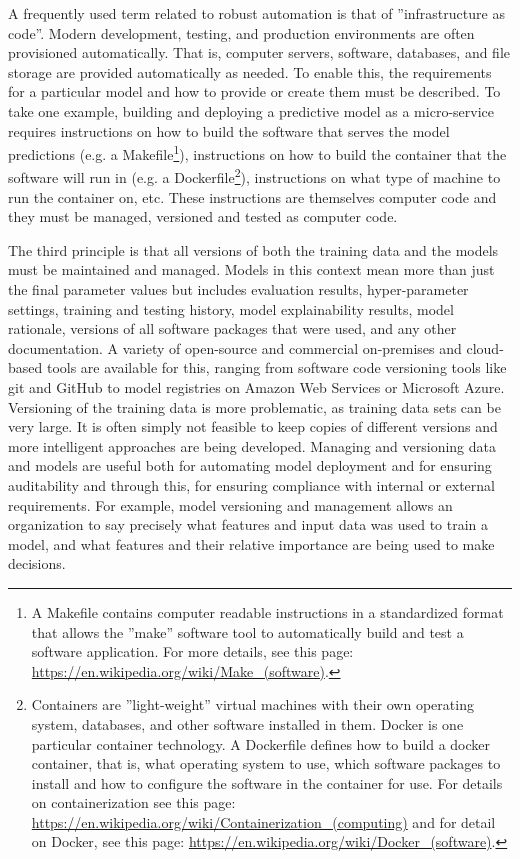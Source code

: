 A frequently used term related to robust automation is that of ''infrastructure as code''. Modern development, testing, and production environments are often provisioned automatically. That is, computer servers, software, databases, and file storage are provided automatically as needed. To enable this, the requirements for a particular model and how to provide or create them must be described. To take one example, building and deploying a predictive model as a micro-service requires instructions on how to build the software that serves the model predictions (e.g. a Makefile\footnote{A Makefile contains computer readable instructions in a standardized format that allows the ''make'' software tool to automatically build and test a software application. For more details, see this page: \url{https://en.wikipedia.org/wiki/Make_(software)}.}), instructions on how to build the container that the software will run in (e.g. a Dockerfile\footnote{Containers are ''light-weight'' virtual machines with their own operating system, databases, and other software installed in them. Docker is one particular container technology. A Dockerfile defines how to build a docker container, that is, what operating system to use, which software packages to install and how to configure the software in the container for use. For details on containerization see this page: \url{https://en.wikipedia.org/wiki/Containerization_(computing)} and for detail on Docker, see this page: \url{https://en.wikipedia.org/wiki/Docker_(software)}.}), instructions on what type of machine to run the container on, etc. These instructions are themselves computer code and they must be managed, versioned and tested as computer code. 

The third principle is that all versions of both the training data and the models must be maintained and managed. Models in this context mean more than just the final parameter values but includes evaluation results, hyper-parameter settings, training and testing history, model explainability results, model rationale, versions of all software packages that were used, and any other documentation. A variety of open-source and commercial on-premises and cloud-based tools are available for this, ranging from software code versioning tools like git and GitHub to model registries on Amazon Web Services or Microsoft Azure. Versioning of the training data is more problematic, as training data sets can be very large. It is often simply not feasible to keep copies of different versions and more intelligent approaches are being developed. Managing and versioning data and models are useful both for automating model deployment and for ensuring auditability and through this, for ensuring compliance with internal or external requirements. For example, model versioning and management allows an organization to say precisely what features and input data was used to train a model, and what features and their relative importance are being used to make decisions. 

